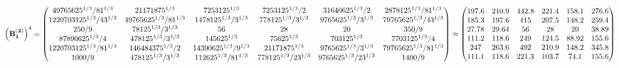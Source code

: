 \documentclass[10pt,a4paper]{article}
\begin{document}
	\[
		\left(\bold{B_1^{(2)}}\right)^{4} = 
		\begin{pmatrix}
			{{4}{9765625^ {1 / 3}}} / {{81^ {1 / 3}}} & {{2}{1171875^ {1 / 3}}}{} & {{7}{253125^ {1 / 3}}}{} & {{7}{253125^ {1 / 3}}} / {{2}} & {{31640625^ {1 / 3}}} / {{2}} & {{28}{78125^ {1 / 3}}} / {{81^ {1 / 3}}} \\
			{{1220703125^ {1 / 3}}} / {{4}{3^ {1 / 3}}} & {{4}{9765625^ {1 / 3}}} / {{81^ {1 / 3}}} & {{14}{78125^ {1 / 3}}} / {{3^ {1 / 3}}} & {{7}{78125^ {1 / 3}}} / {{3^ {1 / 3}}} & {{9765625^ {1 / 3}}} / {{3^ {1 / 3}}} & {{7}{9765625^ {1 / 3}}} / {{4}{3^ {1 / 3}}} \\
			{{250}} / {{9}} & {{78125^ {1 / 3}}} / {{3^ {1 / 3}}} & {{56}}{} & {{28}}{} & {{20}}{} & {{350}} / {{9}} \\
			{{87890625^ {1 / 3}}} / {{4}} & {{4}{78125^ {1 / 3}}} / {{3^ {1 / 3}}} & {{14}{5625^ {1 / 3}}}{} & {{7}{5625^ {1 / 3}}}{} & {{703125^ {1 / 3}}}{} & {{7}{703125^ {1 / 3}}} / {{4}} \\
			{{1220703125^ {1 / 3}}} / {{81^ {1 / 3}}} & {{146484375^ {1 / 3}}} / {{2}} & {{14}{390625^ {1 / 3}}} / {{9^ {1 / 3}}} & {{2}{1171875^ {1 / 3}}}{} & {{9765625^ {1 / 3}}} / {{3^ {1 / 3}}} & {{7}{9765625^ {1 / 3}}} / {{81^ {1 / 3}}} \\
			{{1000}} / {{9}} & {{4}{78125^ {1 / 3}}} / {{3^ {1 / 3}}} & {{112}{625^ {1 / 3}}} / {{81^ {1 / 3}}} & {{7}{78125^ {1 / 3}}} / {{2}{3^ {1 / 3}}} & {{9765625^ {1 / 3}}} / {{2}{3^ {1 / 3}}} & {{1400}} / {{9}} \\
		\end{pmatrix}
		\approx
		\begin{pmatrix}
			197.6    & 210.9    & 442.8    & 221.4    & 158.1    & 276.6    \\
			185.3    & 197.6    & 415      & 207.5    & 148.2    & 259.4    \\
			27.78    & 29.64    & 56       & 28       & 20       & 38.89    \\
			111.2    & 118.6    & 249      & 124.5    & 88.92    & 155.6    \\
			247      & 263.6    & 492      & 210.9    & 148.2    & 345.8    \\
			111.1    & 118.6    & 221.3    & 103.7    & 74.1     & 155.6    \\
		\end{pmatrix}
	\]
\end{document}
